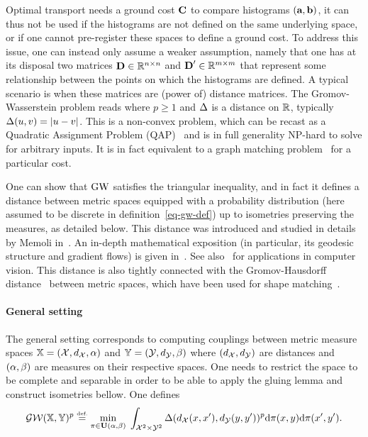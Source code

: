 Optimal transport needs a ground cost $\mathrm{\textbf{\upshape C}}$ to compare histograms $(\mathrm{\textbf{\upshape a}},\mathrm{\textbf{\upshape b}})$, it can thus not be used if the histograms are not defined on the same underlying space, or if one cannot pre-register these spaces to define a ground cost. 
%
To address this issue, one can instead only assume a weaker assumption, namely that one has at its disposal two matrices $\mathrm{\textbf{\upshape D}} \in \mathbb{R}^{n \times n}$ and $\mathrm{\textbf{\upshape D}}' \in \mathbb{R}^{m \times m}$ that represent some relationship between the points on which the histograms are defined. A typical scenario is when these matrices are (power of) distance matrices.
%
The Gromov-Wasserstein problem reads
where $p \geq 1$ and $\Delta$ is a distance on $\mathbb{R}$, typically $\Delta(u,v)=|u-v|$.
%
This is a non-convex problem, which can be recast as a Quadratic Assignment Problem (QAP)~\cite{loiola-2007} and is in full generality NP-hard to solve for arbitrary inputs. 
%
It is in fact equivalent to a graph matching problem~\cite{lyzinski-2015} for a particular cost.

One can show that $\operatorname{\mathrm{GW}}$ satisfies the triangular inequality, and in fact it defines a distance between metric spaces equipped with a probability distribution (here assumed to be discrete in definition~\eqref{eq-gw-def}) up to isometries preserving the measures, as detailed below.
%
This distance was introduced and studied in details by Memoli in~\cite{memoli-2011}. An in-depth mathematical exposition (in particular, its geodesic structure and gradient flows) is given in~\cite{SturmGW}. See also~\cite{schmitzer2013modelling} for applications in computer vision.
%
This distance is also tightly connected with the Gromov-Hausdorff distance~\cite{gromov-2001} between metric spaces, which have been used for shape matching~\cite{memoli-2007,bronstein-2010}. 


\paragraph{General setting} 

The general setting corresponds to computing couplings between metric measure spaces $\mathbb{X}=(\mathcal{X},d_{\mathcal{X}},\alpha)$
	and $\mathbb{Y}=(\mathcal{Y},d_{\mathcal{Y}},\beta)$ where $(d_{\mathcal{X}},d_{\mathcal{Y}})$ are distances and $(\alpha,\beta)$ are measures on their respective spaces.
	One needs to restrict the space to be complete and separable in order to be able to apply the gluing lemma and construct isometries bellow.
	One defines 
	\begin{align}
		\label{eq-gw-generic}
		\operatorname{\mathcal{GW}}( \mathbb{X},\mathbb{Y} )^p \stackrel{\mbox{\upshape\tiny def.}}{=} 
		\underset{ \pi \in \mathrm{\textbf{\upshape U}}(\alpha,\beta) }{\min}\; 
		\int_{\mathcal{X}^2 \times \mathcal{Y}^2}
		 \Delta(d_{\mathcal{X}}(x,x'),d_{\mathcal{Y}}(y,y'))^p
		\mathrm{d}\pi(x,y)\mathrm{d}\pi(x',y').
	\end{align}
 
